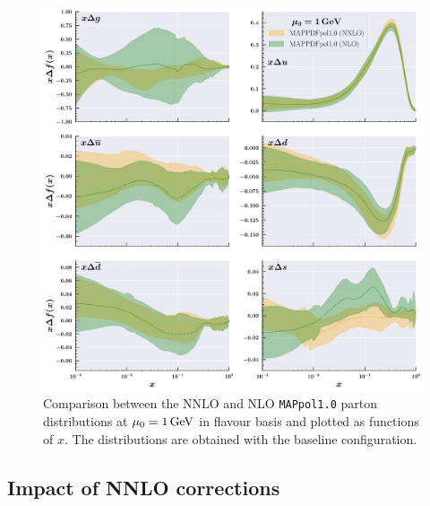 \begin{figure}[t!]
  \centering
  \includegraphics[width=\textwidth]{Chapters/Chapter_4/figs/nnlo_nlo.pdf}
  \caption{\small{Comparison between the NNLO and NLO \texttt{MAPpol1.0} parton distributions at $\mu_0 = 1 \, \textrm{GeV}$ in flavour basis and plotted as functions of $x$. The distributions are obtained with the baseline configuration.}}
  \label{fig:nnlo_nlo}
\end{figure}

\subsection{Impact of NNLO corrections}

